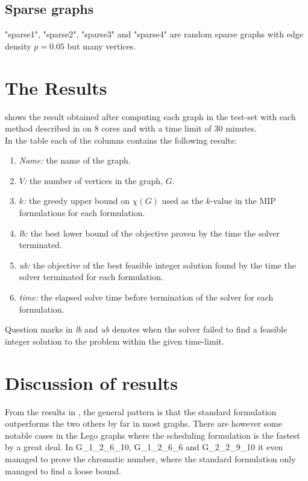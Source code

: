 \subsection{Sparse graphs}
"sparse1", "sparse2", "sparse3" and "sparse4" are random sparse graphs with edge density $p=0.05$ but many vertices. 
\section{The Results}
 shows the result obtained after computing each graph in the test-set with each method described in  on 8 cores and with a time limit of 30 minutes. \\
In the table each of the columns contains the following results:
\begin{enumerate}
\item \textit{Name:} the name of the graph.
\item \textit{$V$:} the number of vertices in the graph, $G$.
\item \textit{$k$:} the greedy upper bound on $\chi(G)$ used as the $k$-value in the MIP formulations for each formulation.
\item \textit{lb:} the best lower bound of the objective proven by the time the solver terminated.
\item \textit{ub:} the objective of the best feasible integer solution found by the time the solver terminated for each formulation.
\item \textit{time:} the elapsed solve time before termination of the solver for each formulation.
\end{enumerate}
\noindent Question marks in \textit{lb} and \textit{ub} denotes when the solver failed to find a feasible integer solution to the problem within the given time-limit.

\begin{scriptsize}

\end{scriptsize}
\section{Discussion of results}
From the results in , the general pattern is that the standard formulation outperforms the two others by far in most graphs. There are however some notable cases in the Lego graphs where the scheduling formulation is the fastest by a great deal. In G\_1\_2\_6\_10, G\_1\_2\_6\_6 and G\_2\_2\_9\_10 it even managed to prove the chromatic number, where the standard formulation only managed to find a loose bound.

